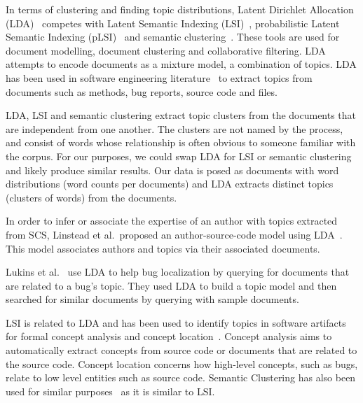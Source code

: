 \documentclass[times, 10pt,twocolumn]{article}
\newcommand{\shrinkit}{\vspace*{-.3em}}
\begin{document}

In terms of clustering and finding topic distributions, Latent
Dirichlet Allocation (LDA)~\cite{944937} competes with Latent Semantic
Indexing
(LSI)~\cite{1374321-short,10.1109/ICPC.2007.13-short},
probabilistic Latent Semantic Indexing (pLSI)~\cite{944937} and
semantic clustering~\cite{1698774-short,1566153-short}. These tools are used for
document modelling, document clustering and collaborative
filtering. LDA attempts to encode documents as a mixture
model, a combination of topics.  LDA has been used in software engineering
literature~\cite{lukins2008,10.1109/MSR.2007.20-short}%
to extract topics from documents such as methods, bug
reports, source code and files.

LDA, LSI and semantic clustering extract topic
clusters from the documents that are independent from one another. 
The clusters are not named by the process, and consist of
words whose
relationship is often obvious to someone familiar with the corpus. For our purposes, we
could swap LDA for LSI or semantic clustering and likely produce similar
results. Our data is posed as documents with word distributions (word
counts per documents) and LDA extracts distinct topics (clusters of
words) from the documents.

\shrinkit
{}
\shrinkit




In order to infer or associate the expertise of an author with topics
extracted from SCS, Linstead et al.\  proposed an author-source-code model
using LDA~\cite{10.1109/MSR.2007.20-short}.%
This model associates authors and topics via their associated documents.


Lukins et al.~\cite{lukins2008} use LDA to help bug
localization by querying for documents that are related to a bug's
topic. They used LDA to build a topic model and then searched for
similar documents by querying with sample documents.

LSI is related to LDA and has been used to identify topics in software
artifacts for formal concept analysis and concept
location~\cite{1374321-short,10.1109/ICPC.2007.13-short}.
Concept analysis aims to automatically extract concepts from source
code or documents that are related to the source code.  Concept location concerns how
high-level concepts, such as bugs, relate to low level entities such as source code. 
Semantic Clustering has also been
used for similar purposes~\cite{1698774-short,1566153-short} as it is similar to
LSI.
\end{document}
